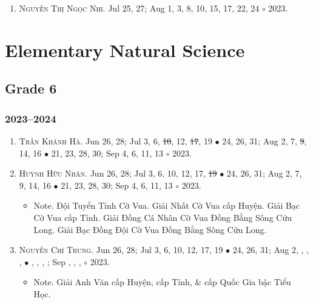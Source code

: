 \documentclass{article}
\begin{document}
\begin{enumerate}
	\item \textsc{Nguyễn Thị Ngọc Nhi.} {\sf[In]} Jul 25, 27; Aug 1, 3, 8, 10, 15, 17, 22, 24 $\circ$ 2023.
\end{enumerate}


\section{Elementary Natural Science}

\subsection{Grade 6}

\subsubsection{2023--2024}

\begin{enumerate}
	\item \textsc{Trần Khánh Hà.} {\sf[In]} Jun 26, 28; Jul 3, 6, \st{10}, 12, \st{17}, 19 $\bullet$ 24, 26, 31; Aug 2, 7, \st{9}, 14, 16 $\bullet$ 21, 23, 28, 30; Sep 4, 6, 11, 13 $\circ$ 2023.
	\item \textsc{Huỳnh Hữu Nhân.} {\sf[In]} Jun 26, 28; Jul 3, 6, 10, 12, 17, \st{19} $\bullet$ 24, 26, 31; Aug 2, 7, 9, 14, 16 $\bullet$ 21, 23, 28, 30; Sep 4, 6, 11, 13 $\circ$ 2023.
	\begin{itemize}
		\item {\sf Note.} Đội Tuyển Tỉnh Cờ Vua. Giải Nhất Cờ Vua cấp Huyện. Giải Bạc Cờ Vua cấp Tỉnh. Giải Đồng Cá Nhân Cờ Vua Đồng Bằng Sông Cửu Long. Giải Bạc Đồng Đội Cờ Vua Đồng Bằng Sông Cửu Long.
	\end{itemize}
	\item \textsc{Nguyễn Chí Trung.} {\sf[In]} Jun 26, 28; Jul 3, 6, 10, 12, 17, 19 $\bullet$ 24, 26, 31; Aug 2, , , ,  $\bullet$ , , , ; Sep , , ,  $\circ$ 2023.
	\begin{itemize}
		\item {\sf Note.} Giải Anh Văn cấp Huyện, cấp Tỉnh, \& cấp Quốc Gia bậc Tiểu Học.
	\end{itemize}
\end{enumerate}
\end{document}
